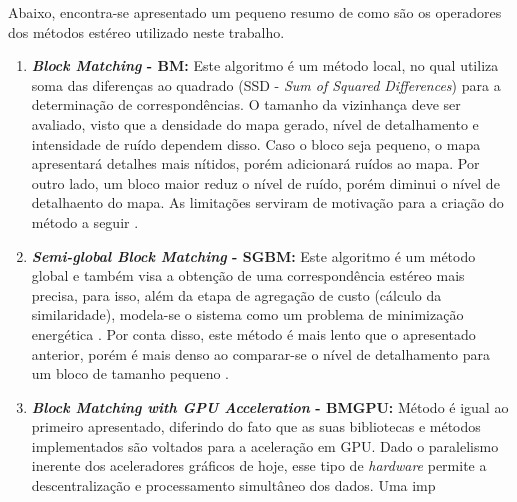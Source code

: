 Abaixo, encontra-se apresentado um pequeno resumo de como são os operadores dos métodos estéreo utilizado neste trabalho.
\begin{enumerate}
 \item \textbf{\textit{Block Matching} - BM:} Este algoritmo é um método local, no qual utiliza soma das diferenças ao quadrado (SSD - \textit{Sum of Squared Differences}) para a determinação de correspondências. O tamanho da vizinhança deve ser avaliado, visto que a densidade do mapa gerado, nível de detalhamento e intensidade de ruído dependem disso. Caso o bloco seja pequeno, o mapa apresentará detalhes mais nítidos, porém adicionará ruídos ao mapa. Por outro lado, um bloco maior reduz o nível de ruído, porém diminui o nível de detalhaento do mapa. As limitações serviram de motivação para a criação do método a seguir \cite{Hirschmuller2008}.   
 \item \textbf{\textit{Semi-global Block Matching} - SGBM:} Este algoritmo é um método global e também visa a obtenção de uma correspondência estéreo mais precisa, para isso, além da etapa de agregação de custo (cálculo da similaridade), modela-se o sistema como um problema de minimização energética \cite{JunhwanKim2003}. Por conta disso, este método é mais lento que o apresentado anterior, porém é mais denso ao comparar-se o nível de detalhamento para um bloco de tamanho pequeno \cite{Hirschmuller2008}.
 
 \item \textbf{\textit{Block Matching with GPU Acceleration} - BMGPU:} Método é igual ao primeiro apresentado, diferindo do fato que as suas bibliotecas e métodos implementados são voltados para a aceleração em GPU. Dado o paralelismo inerente dos aceleradores gráficos de hoje, esse tipo de \textit{hardware} permite a descentralização e processamento simultâneo dos dados. Uma imp
 \end{enumerate}

 






